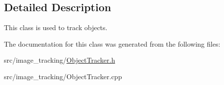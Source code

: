 \subsection{Detailed Description}
This class is used to track objects. 

The documentation for this class was generated from the following files\+:\begin{DoxyCompactItemize}
\item 
src/image\+\_\+tracking/\mbox{\hyperlink{_object_tracker_8h}{Object\+Tracker.\+h}}\item 
src/image\+\_\+tracking/Object\+Tracker.\+cpp\end{DoxyCompactItemize}
